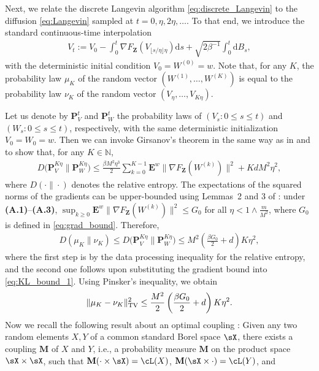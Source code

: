 \documentclass[final,12pt]{colt2018}
\numberwithin{equation}{section}
\numberwithin{equation}{section}
\def\E{\mathbf{E}}
\def\PP{\mathbf{P}}
\def\MM{\mathbf{M}}
\def\Naturals{\mathbb{N}}
\def\deq{:=}
\def\bd#1{\mathbf{#1}}
\def\bZ{\bd{Z}}
\def\d{{\mathrm d}}
\begin{document}
Next, we relate the discrete Langevin algorithm \eqref{eq:discrete_Langevin} to the diffusion \eqref{eq:Langevin} sampled at $t=0,\eta,2\eta,\ldots$. To that end, we introduce the standard continuous-time interpolation 
\begin{align*}
	V_t \deq V_0 - \int^t_0 \nabla F_\bZ(V_{\lfloor s/\eta \rfloor\eta}) \d s + \sqrt{2\beta^{-1}}\int^t_0 \d B_s,
\end{align*}
with the deterministic initial condition $V_0 = W^{(0)} = w$. Note that, for any $K$, the probability law $\mu_K$ of the random vector $(W^{(1)},\ldots,W^{(K)})$ is equal to the probability law $\nu_K$ of the random vector $(V_\eta,\ldots,V_{K\eta})$. 

Let us denote by $\PP^t_V$ and $\PP^t_W$ the probability laws of $(V_s: 0 \le s \le t)$ and $(W_s: 0 \le s \le t)$, respectively, with the same deterministic initialization $V_0 = W_0 = w$. Then we can invoke Girsanov's theorem in the same way as in \cite{dalalyan2017theoretical} and \cite*{rrt_colt17} to show that, for any $K \in \Naturals$,
\begin{align}\label{eq:KL_bound_1}
	D\big(\PP^{K\eta}_V \big\| \PP^{K\eta}_W \big) \le \frac{\beta M^2\eta^3}{2}\sum^{K-1}_{k=0} \E^{w} \|\nabla F_\bZ(W^{(k)})\|^2 + KdM^2\eta^2,
\end{align}
where $D(\cdot\|\cdot)$ denotes the relative entropy. The expectations of the squared norms of the gradients can be upper-bounded using Lemmas~2 and 3 of \cite*{rrt_colt17}: under {\bf (A.1)}--{\bf (A.3)}, $\sup_{k \ge 0} \E^w \| \nabla F_\bZ(W^{(k)})\|^2 \le  G_0$ for all $\eta < 1 \wedge \frac{m}{M^2}$, where $G_0$ is defined in \eqref{eq:grad_bound}. Therefore, 
\begin{align*}
	D(\mu_K \| \nu_K) \le D\big(\PP^{K\eta}_V \big\| \PP^{K\eta}_W \big) \le M^2\left(\frac{\beta G_0}{2}+d\right)K\eta^2,
\end{align*}
where the first step is by the data processing inequality for the relative entropy, and the second one follows upon substituting the gradient bound into \eqref{eq:KL_bound_1}. Using Pinsker's inequality, we obtain
\begin{align*}
	\|\mu_K - \nu_K\|^2_{\rm TV} \le  \frac{M^2}{2}\left(\frac{\beta G_0}{2}+d\right)K\eta^2.
\end{align*}
Now we recall the following result about an optimal coupling \citep[Theorem~5.2]{Lindvall_coupling}: Given any two random elements $X,Y$ of a common standard Borel space $\sX$, there exists a coupling $\MM$ of $X$ and $Y$, i.e., a probability measure $\MM$ on the product space $\sX \times \sX$, such that $\MM(\cdot \times \sX) = \cL(X)$, $\MM(\sX \times \cdot) = \cL(Y)$, and 
\end{document}
